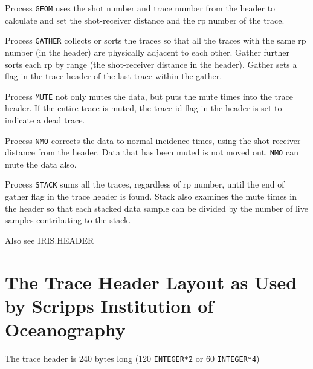 Process \texttt{GEOM} uses the \gls{shot} number and trace number from the header to
calculate and set the shot-receiver distance and the \gls{rp} number of the trace.

Process \texttt{GATHER} collects or sorts the traces so that all the traces
with the same \gls{rp} number (in the header) are physically adjacent to each other.
Gather further sorts each \gls{rp} by range (the shot-receiver distance in the
header).  Gather sets a flag in the trace header of the last trace within
the \gls{gather}.

Process \texttt{MUTE} not only mutes the data, but puts the mute times into the
trace header.  If the entire trace is muted, the trace id flag in the header is
set to indicate a dead trace.

Process \texttt{NMO} corrects the data to normal incidence times, using the
shot-receiver distance from the header.  Data that has been muted is not
moved out.  \texttt{NMO} can mute the data also.

Process \texttt{STACK} sums all the traces, regardless of \gls{rp} number, until the
end of gather flag in the trace header is found.  Stack also examines the mute
times in the header so that each stacked data sample can be divided by the
number of live samples contributing to the stack.

Also see IRIS.HEADER

\section[Trace Header Layout]{The Trace Header Layout as Used by Scripps Institution of Oceanography}

The trace header is 240 bytes long (120 \texttt{INTEGER*2} or 60 \texttt{INTEGER*4})

